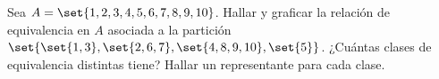 \begin{enunciado}{\ejercicio}
  Sea $A = \set{1,2,3,4,5,6,7,8,9,10}$.
  Hallar y graficar la relación de equivalencia en $A$ asociada a la partición
  $\set{ \set{1,3}, \set{2,6,7}, \set{4,8,9,10}, \set{5} }$.
  ¿Cuántas clases de equivalencia distintas tiene? Hallar un representante para cada clase.
\end{enunciado}

\hacer

